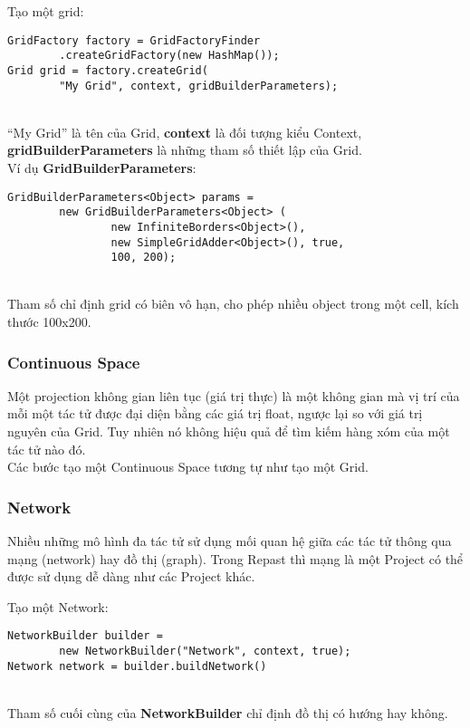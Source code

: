 \documentclass[../report.tex]{subfiles}
\begin{document}
\noindent Tạo một grid: \\
\HRule
\begin{lstlisting}
GridFactory factory = GridFactoryFinder
        .createGridFactory(new HashMap());
Grid grid = factory.createGrid(
        "My Grid", context, gridBuilderParameters);
\end{lstlisting}
\HRule \\
``My Grid'' là tên của Grid, \textbf{context} là đối tượng kiểu Context, 
\textbf{gridBuilderParameters} là những tham số thiết lập của Grid. \\
Ví dụ \textbf{GridBuilderParameters}: \\
\HRule
\begin{lstlisting}
GridBuilderParameters<Object> params = 
        new GridBuilderParameters<Object> (
                new InfiniteBorders<Object>(),
                new SimpleGridAdder<Object>(), true,
                100, 200);
\end{lstlisting}
\HRule \\
Tham số chỉ định grid có biên vô hạn, cho phép nhiều object trong một cell, kích thước 100x200. 

\subsubsection{Continuous Space}
Một projection không gian liên tục (giá trị thực) là một không gian mà vị trí của mỗi một tác tử được đại diện 
bằng các giá trị float, ngược lại so với giá trị nguyên của Grid. Tuy nhiên nó không hiệu quả để tìm kiếm hàng xóm của 
một tác tử nào đó.  \\
Các bước tạo một Continuous Space tương tự như tạo một Grid. 

\subsubsection{Network}
Nhiều những mô hình đa tác tử sử dụng mối quan hệ giữa các tác tử thông qua mạng (network) hay đồ thị (graph). 
Trong Repast thì mạng là một Project có thể được sử dụng dễ dàng như các Project khác. 

\noindent Tạo một Network: \\
\HRule
\begin{lstlisting}
NetworkBuilder builder = 
        new NetworkBuilder("Network", context, true);
Network network = builder.buildNetwork()
\end{lstlisting}
\HRule \\
Tham số cuối cùng của \textbf{NetworkBuilder} chỉ định đồ thị có hướng hay không. 
\end{document}
